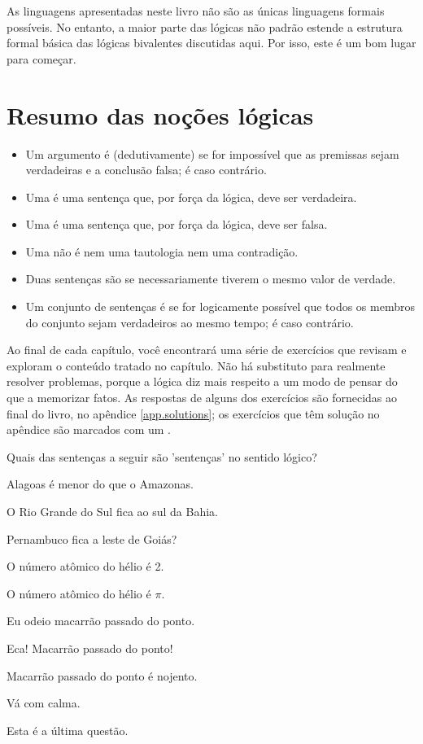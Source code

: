 As linguagens apresentadas neste livro não são as únicas linguagens formais possíveis. No entanto, a maior parte das lógicas não padrão estende a estrutura formal básica das lógicas bivalentes discutidas aqui. Por isso, este é um bom lugar para começar.

\section*{Resumo das noções lógicas}
\begin{itemize}
\item Um argumento é (dedutivamente)  se for impossível que as premissas sejam verdadeiras e a conclusão falsa; é  caso contrário.

\item Uma  é uma sentença que, por força da lógica, deve ser verdadeira.

\item Uma  é uma sentença que, por força da lógica, deve ser falsa.

\item Uma  não é nem uma tautologia nem uma contradição.

\item Duas sentenças são  se necessariamente tiverem o mesmo valor de verdade.

\item Um conjunto de sentenças é  se for logicamente possível que todos os membros do conjunto sejam verdadeiros ao mesmo tempo; é  caso contrário.
\end{itemize}

\practiceproblems
Ao final de cada capítulo, você encontrará uma série de exercícios que revisam e exploram o conteúdo tratado no capítulo. Não há substituto para realmente resolver problemas, porque a lógica diz mais respeito a um modo de pensar do que a memorizar fatos. As respostas de alguns dos exercícios são fornecidas ao final do livro, no apêndice \ref{app.solutions}; os exercícios que têm solução no apêndice são marcados com um \solutions.

\problempart
Quais das sentenças a seguir são 'sentenças' no sentido lógico?
\begin{earg}
\item Alagoas é menor do que o Amazonas.
\item O Rio Grande do Sul fica ao sul da Bahia.
\item Pernambuco fica a leste de Goiás?
\item O número atômico do hélio é 2.
\item O número atômico do hélio é $\pi$.
\item Eu odeio macarrão passado do ponto.
\item Eca! Macarrão passado do ponto!
\item Macarrão passado do ponto é nojento.
\item Vá com calma.
\item Esta é a última questão.
\end{earg}


